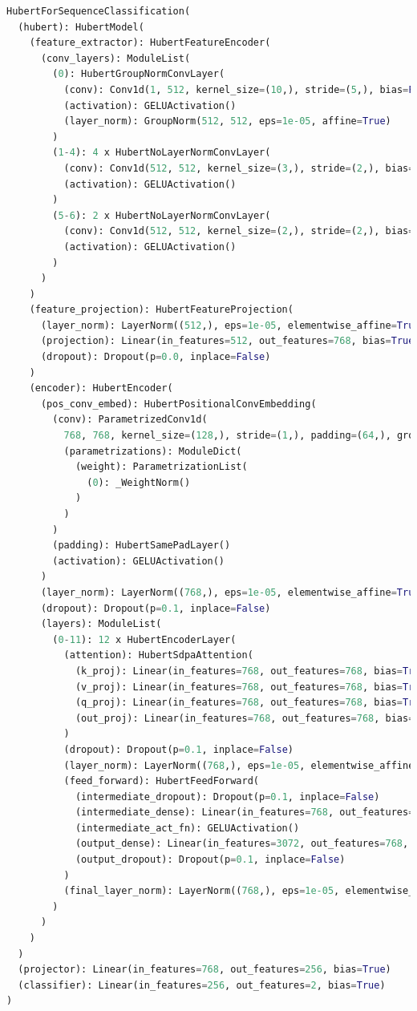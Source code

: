 \documentclass[10pt]{ltjsarticle}
\begin{document}
\begin{lstlisting}[language=Python]
HubertForSequenceClassification(
  (hubert): HubertModel(
    (feature_extractor): HubertFeatureEncoder(
      (conv_layers): ModuleList(
        (0): HubertGroupNormConvLayer(
          (conv): Conv1d(1, 512, kernel_size=(10,), stride=(5,), bias=False)
          (activation): GELUActivation()
          (layer_norm): GroupNorm(512, 512, eps=1e-05, affine=True)
        )
        (1-4): 4 x HubertNoLayerNormConvLayer(
          (conv): Conv1d(512, 512, kernel_size=(3,), stride=(2,), bias=False)
          (activation): GELUActivation()
        )
        (5-6): 2 x HubertNoLayerNormConvLayer(
          (conv): Conv1d(512, 512, kernel_size=(2,), stride=(2,), bias=False)
          (activation): GELUActivation()
        )
      )
    )
    (feature_projection): HubertFeatureProjection(
      (layer_norm): LayerNorm((512,), eps=1e-05, elementwise_affine=True)
      (projection): Linear(in_features=512, out_features=768, bias=True)
      (dropout): Dropout(p=0.0, inplace=False)
    )
    (encoder): HubertEncoder(
      (pos_conv_embed): HubertPositionalConvEmbedding(
        (conv): ParametrizedConv1d(
          768, 768, kernel_size=(128,), stride=(1,), padding=(64,), groups=16
          (parametrizations): ModuleDict(
            (weight): ParametrizationList(
              (0): _WeightNorm()
            )
          )
        )
        (padding): HubertSamePadLayer()
        (activation): GELUActivation()
      )
      (layer_norm): LayerNorm((768,), eps=1e-05, elementwise_affine=True)
      (dropout): Dropout(p=0.1, inplace=False)
      (layers): ModuleList(
        (0-11): 12 x HubertEncoderLayer(
          (attention): HubertSdpaAttention(
            (k_proj): Linear(in_features=768, out_features=768, bias=True)
            (v_proj): Linear(in_features=768, out_features=768, bias=True)
            (q_proj): Linear(in_features=768, out_features=768, bias=True)
            (out_proj): Linear(in_features=768, out_features=768, bias=True)
          )
          (dropout): Dropout(p=0.1, inplace=False)
          (layer_norm): LayerNorm((768,), eps=1e-05, elementwise_affine=True)
          (feed_forward): HubertFeedForward(
            (intermediate_dropout): Dropout(p=0.1, inplace=False)
            (intermediate_dense): Linear(in_features=768, out_features=3072, bias=True)
            (intermediate_act_fn): GELUActivation()
            (output_dense): Linear(in_features=3072, out_features=768, bias=True)
            (output_dropout): Dropout(p=0.1, inplace=False)
          )
          (final_layer_norm): LayerNorm((768,), eps=1e-05, elementwise_affine=True)
        )
      )
    )
  )
  (projector): Linear(in_features=768, out_features=256, bias=True)
  (classifier): Linear(in_features=256, out_features=2, bias=True)
)
\end{lstlisting}
\end{document}

